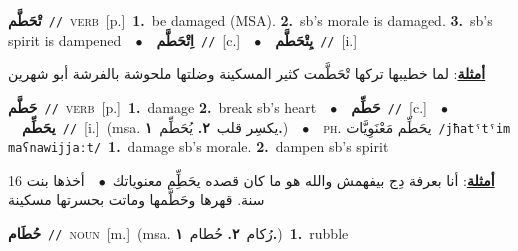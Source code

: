 \documentclass[10pt,a4paper,twoside]{article} %
\begin{document}
\begin{multicols}{2}
{\setlength\topsep{0pt}\textbf{\foreignlanguage{arabic}{تْحَطَّم}}\ {\color{gray}\texttt{//}\color{black}}\ \textsc{verb}\ [p.]\ \textbf{1.}~be damaged (MSA).  \textbf{2.}~sb's morale is damaged.  \textbf{3.}~sb's spirit is dampened\ \ $\bullet$\ \ \setlength\topsep{0pt}\textbf{\foreignlanguage{arabic}{اِتْحَطَّم}}\ {\color{gray}\texttt{//}\color{black}}\ [c.]\ \ $\bullet$\ \ \setlength\topsep{0pt}\textbf{\foreignlanguage{arabic}{يِتْحَطَّم}}\ {\color{gray}\texttt{//}\color{black}}\ [i.]\  \begin{flushright}\color{gray}\foreignlanguage{arabic}{\textbf{\underline{\foreignlanguage{arabic}{أمثلة}}}: لما خطيبها تركها تْحَطَّمت كثير المسكينة وضلتها ملحوشة بالفرشة أبو شهرين}\end{flushright}\color{black}} \vspace{2mm}

{\setlength\topsep{0pt}\textbf{\foreignlanguage{arabic}{حَطَّم}}\ {\color{gray}\texttt{//}\color{black}}\ \textsc{verb}\ [p.]\ \textbf{1.}~damage  \textbf{2.}~break sb's heart\ \ $\bullet$\ \ \setlength\topsep{0pt}\textbf{\foreignlanguage{arabic}{حَطِّم}}\ {\color{gray}\texttt{//}\color{black}}\ [c.]\ \ $\bullet$\ \ \setlength\topsep{0pt}\textbf{\foreignlanguage{arabic}{يحَطِّم}}\ {\color{gray}\texttt{//}\color{black}}\ [i.]\ \color{gray}(msa. \foreignlanguage{arabic}{يكسِر قلب}~\foreignlanguage{arabic}{\textbf{٢.}}  \foreignlanguage{arabic}{يُحَطِّم}~\foreignlanguage{arabic}{\textbf{١.}})\color{black}\ \ $\bullet$\ \ \textsc{ph.} \color{gray} \foreignlanguage{arabic}{يحَطِّم مَعْنَوِيَّات}\color{black}\ {\color{gray}\texttt{/{\sffamily jħatˤtˤim maʕnawijjaːt}/}\color{black}}\ \textbf{1.}~damage sb's morale.  \textbf{2.}~dampen sb's spirit\  \begin{flushright}\color{gray}\foreignlanguage{arabic}{\textbf{\underline{\foreignlanguage{arabic}{أمثلة}}}: أنا بعرفة دِج بيفهمش والله هو ما كان قصده يحَطِِّم معنوياتك\ $\bullet$\ \  أخذها بنت 16 سنة. قهرها وحَطَّمها وماتت بحسرتها مسكينة}\end{flushright}\color{black}} \vspace{2mm}

{\setlength\topsep{0pt}\textbf{\foreignlanguage{arabic}{حُطَام}}\ {\color{gray}\texttt{//}\color{black}}\ \textsc{noun}\ [m.]\ \color{gray}(msa. \foreignlanguage{arabic}{رُكام}~\foreignlanguage{arabic}{\textbf{٢.}}  \foreignlanguage{arabic}{حُطام}~\foreignlanguage{arabic}{\textbf{١.}})\color{black}\ \textbf{1.}~rubble\ } \vspace{2mm}


\end{multicols}
\end{document}
